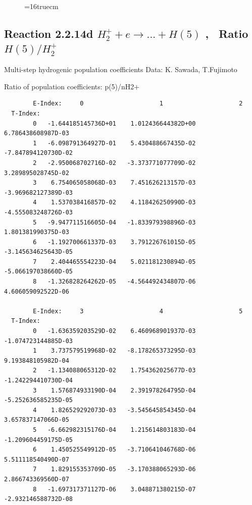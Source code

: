 \documentclass[12pt,dvipdfmx]{article}
\begin{document}
\begin{figure} \label{2.2.14c}
\epsfxsize=16truecm
\end{figure}
\newpage


\subsection{
Reaction 2.2.14d $ H_2^+ + e \rightarrow ...+ H(5) $ , \   Ratio $H(5)/H_2^+  $
}

 Multi-step hydrogenic population coefficients
 Data: K. Sawada, T.Fujimoto \cite{kn:Sawada}

 Ratio of population coefficients: p(5)/nH2+

\begin{small}\begin{verbatim}
        E-Index:     0                     1                     2
  T-Index:
        0   -1.644185145736D+01    1.012436644382D+00    6.786438608987D-03
        1   -6.098791364927D-01    5.430488667435D-02   -7.847894120730D-02
        2   -2.950068702716D-02   -3.373771077709D-02    3.289895028745D-02
        3    6.754065058068D-03    7.451626213157D-03   -3.969682127389D-03
        4    1.537038416857D-02    4.118426250990D-03   -4.555083248726D-03
        5   -9.947711516605D-04   -1.833979398896D-03    1.801381990375D-03
        6   -1.192700661337D-03    3.791226761015D-05   -3.145634625643D-05
        7    2.404465554223D-04    5.021181230894D-05   -5.066197038660D-05
        8   -1.326828264262D-05   -4.564492434807D-06    4.606059092522D-06

        E-Index:     3                     4                     5
  T-Index:
        0   -1.636359203529D-02    6.460968901937D-03   -1.074723144885D-03
        1    3.737579519968D-02   -8.178265373295D-03    9.193848105982D-04
        2   -1.134088065312D-02    1.754362025677D-03   -1.242294410730D-04
        3    1.576874933190D-04    2.391978264795D-04   -5.252636585235D-05
        4    1.826529292073D-03   -3.545645854345D-04    3.657837147066D-05
        5   -6.662982315176D-04    1.215614803183D-04   -1.209604459175D-05
        6    1.450525549912D-05   -3.710641046768D-06    5.511118540490D-07
        7    1.829155353709D-05   -3.170388065293D-06    2.866743369560D-07
        8   -1.697317371127D-06    3.048871380215D-07   -2.932146588732D-08


\end{verbatim}
\end{small}
\end{document}
